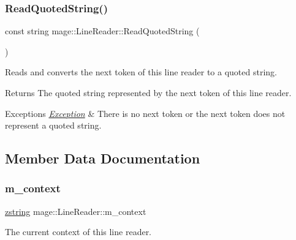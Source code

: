 \subsubsection{\texorpdfstring{Read\+Quoted\+String()}{ReadQuotedString()}}
{\footnotesize\ttfamily const string mage\+::\+Line\+Reader\+::\+Read\+Quoted\+String (\begin{DoxyParamCaption}{ }\end{DoxyParamCaption})\hspace{0.3cm}{\ttfamily [protected]}}

Reads and converts the next token of this line reader to a quoted string.

\begin{DoxyReturn}{Returns}
The quoted string represented by the next token of this line reader. 
\end{DoxyReturn}

\begin{DoxyExceptions}{Exceptions}
{\em \hyperlink{classmage_1_1_exception}{Exception}} & There is no next token or the next token does not represent a quoted string. \\
\hline
\end{DoxyExceptions}


\subsection{Member Data Documentation}
\hypertarget{classmage_1_1_line_reader_ae1f715152d14188cc490870e307099d8}{}\label{classmage_1_1_line_reader_ae1f715152d14188cc490870e307099d8} 
\subsubsection{\texorpdfstring{m\+\_\+context}{m\_context}}
{\footnotesize\ttfamily \hyperlink{namespacemage_a4163ec9a9a27d5e7f4b452dcb99cb2b9}{zstring} mage\+::\+Line\+Reader\+::m\+\_\+context\hspace{0.3cm}{\ttfamily [protected]}}

The current context of this line reader. \hypertarget{classmage_1_1_line_reader_a6de3398ac59fdd98f8c40cff6f5c1075}{}\label{classmage_1_1_line_reader_a6de3398ac59fdd98f8c40cff6f5c1075} 
